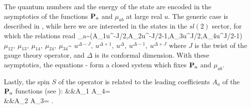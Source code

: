 	






The quantum numbers and the energy of the state are encoded in the asymptotics of the functions ${\bf P}_a$ and $\mu_{ab}$ at large real $u$. The generic case is described in \cite{Gromov:2014caa}, while here we are interested in the states in the $sl(2)$ sector, for which the relations read \cite{Gromov:2013pga}
\beq
\bP_a\sim(A_1u^{-J/2},A_2u^{-J/2-1},A_3u^{J/2},A_4u^{J/2-1})
\label{eq:asymptotics}
\eeq
\beq
	\(\mu_{12},\ \mu_{13},\ \mu_{14},\ \mu_{24},\ \mu_{34}\)\sim
	\(u^{\Delta-J},\ u^{\Delta+1},\ u^{\Delta},\ u^{\Delta-1},\ u^{\Delta+J}\)
\label{eq:muasymptotics}
\eeq
where $J$ is the twist of the gauge theory operator, and $\Delta$ is its conformal dimension. With these asymptotics, the equations - form a closed system which fixes ${\bf P}_a$ and $\mu_{ab}$.

Lastly, the spin $S$ of the operator is related \cite{Gromov:2013pga} to the leading coefficients $A_a$ of the ${\bf P}_a$ functions (see ):
\beqa
&&A_1 A_4= \label{AA1} \\
&&A_2 A_3= \label{AA2}\;.
\eeqa


